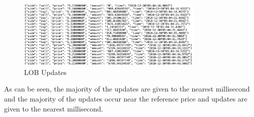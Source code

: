 \begin{figure}[t]
\begin{center}
\includegraphics[width=0.8\textwidth]{Figures/12_30_18_Updates.png}
\caption{LOB Updates}
\label{fig:12_30_18_Updates}
\end{center}
\end{figure}

As can be seen, the majority of the updates are given to the nearest millisecond and the majority of the updates occur near the reference price and updates are given to the nearest millisecond.
